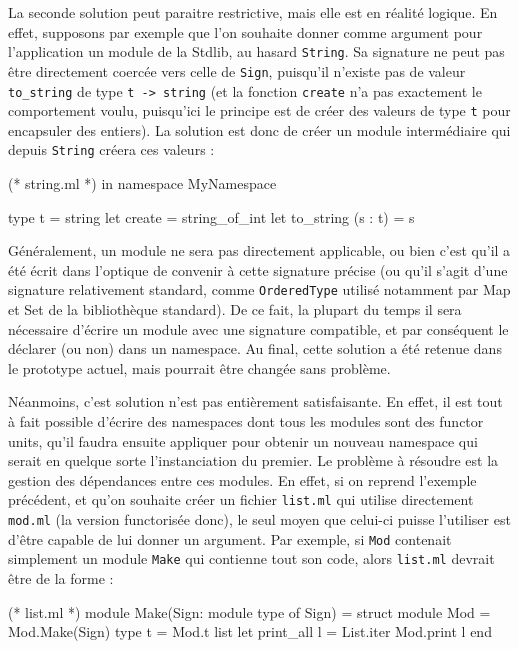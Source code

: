 \documentclass[11pt,a4paper]{report}
\begin{document}
La seconde solution peut paraitre restrictive, mais elle est en réalité
logique. En effet, supposons par exemple que l'on souhaite donner comme argument
pour l'application un module de la Stdlib, au hasard \texttt{String}. Sa
signature ne peut pas être directement coercée vers celle de \texttt{Sign},
puisqu'il n'existe pas de valeur \lstinline{to_string} de type 
\lstinline{t -> string} (et la fonction \lstinline{create} n'a pas exactement le
comportement voulu, puisqu'ici le principe est de créer des valeurs de type
\texttt{t} pour encapsuler des entiers). La solution est donc de créer un module
intermédiaire qui depuis \texttt{String} créera ces valeurs :
\begin{OCaml}
(* string.ml *)
in namespace MyNamespace

type t = string
let create = string_of_int
let to_string (s : t) = s
\end{OCaml}

Généralement, un module ne sera pas directement applicable, ou bien c'est qu'il
a été écrit dans l'optique de convenir à cette signature précise (ou qu'il
s'agit d'une signature relativement standard, comme \texttt{OrderedType} utilisé
notamment par Map et Set de la bibliothèque standard). De ce fait, la plupart du
temps il sera nécessaire d'écrire un module avec une signature compatible, et
par conséquent le déclarer (ou non) dans un namespace. Au final, cette solution
a été retenue dans le prototype actuel, mais pourrait être changée sans
problème.

\medskip

Néanmoins, c'est solution n'est pas entièrement satisfaisante. En effet, il est
tout à fait possible d'écrire des namespaces dont tous les modules sont des
functor units, qu'il faudra ensuite appliquer pour obtenir un nouveau namespace
qui serait en quelque sorte l'instanciation du premier. Le problème à résoudre
est la gestion des dépendances entre ces modules. En effet, si on reprend
l'exemple précédent, et qu'on souhaite créer un fichier \texttt{list.ml} qui
utilise directement \texttt{mod.ml} (la version functorisée donc), le seul moyen
que celui-ci puisse l'utiliser est d'être capable de lui donner un argument. Par
exemple, si \texttt{Mod} contenait simplement un module \texttt{Make} qui
contienne tout son code, alors \texttt{list.ml} devrait être de la forme :
\begin{OCaml}
(* list.ml *)
module Make(Sign: module type of Sign) =
  struct
    module Mod = Mod.Make(Sign)
    type t = Mod.t list
    let print_all l = List.iter Mod.print l
  end
\end{OCaml}
\end{document}
